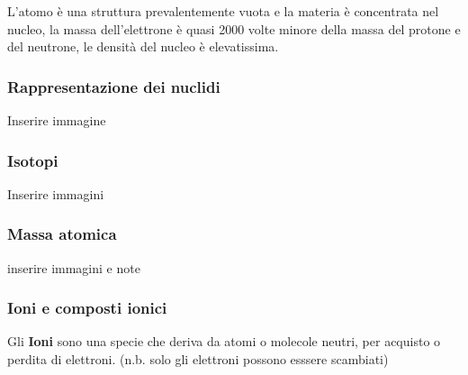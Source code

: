 L'atomo è una struttura prevalentemente vuota e la materia è concentrata nel nucleo, la massa dell'elettrone è quasi 2000 volte minore della massa del protone e del neutrone, le densità del nucleo è elevatissima.

\subsubsection{Rappresentazione dei nuclidi}
Inserire immagine
\subsubsection{Isotopi}
Inserire immagini

\subsubsection{Massa atomica}
inserire immagini e note
\subsubsection{Ioni e composti ionici}
Gli \textbf{Ioni} sono una specie che deriva da atomi o molecole neutri, per acquisto o perdita di elettroni. (n.b. solo gli elettroni possono esssere scambiati)




